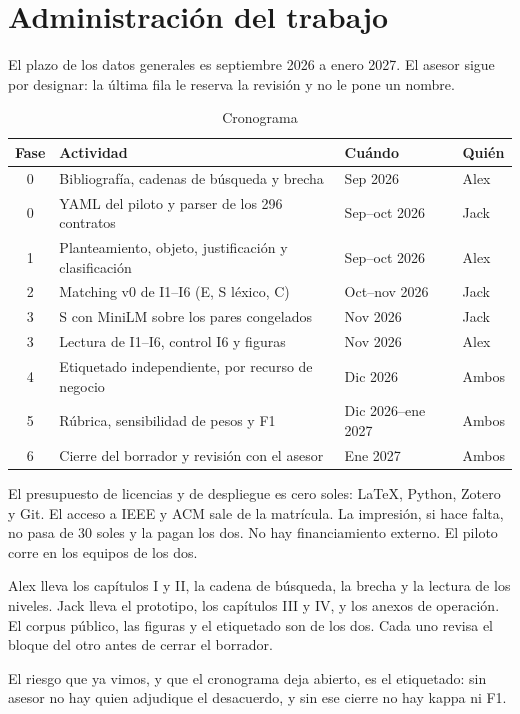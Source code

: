 \chapter{Administración del trabajo}
\label{anexo:admin}

El plazo de los datos generales es septiembre 2026 a enero 2027. El asesor sigue por designar: la última fila le reserva la revisión y no le pone un nombre.

\begin{table}[ht]
  \centering
  \caption{Cronograma}
  \label{tab:cronograma}
  \small
  \begin{tabular}{@{}clll@{}}
    \toprule
    Fase & Actividad & Cuándo & Quién \\
    \midrule
    0 & Bibliografía, cadenas de búsqueda y brecha & Sep 2026 & Alex \\
    0 & YAML del piloto y parser de los 296 contratos & Sep--oct 2026 & Jack \\
    1 & Planteamiento, objeto, justificación y clasificación & Sep--oct 2026 & Alex \\
    2 & Matching v0 de I1--I6 (E, S léxico, C) & Oct--nov 2026 & Jack \\
    3 & S con MiniLM sobre los pares congelados & Nov 2026 & Jack \\
    3 & Lectura de I1--I6, control I6 y figuras & Nov 2026 & Alex \\
    4 & Etiquetado independiente, por recurso de negocio & Dic 2026 & Ambos \\
    5 & Rúbrica, sensibilidad de pesos y F1 & Dic 2026--ene 2027 & Ambos \\
    6 & Cierre del borrador y revisión con el asesor & Ene 2027 & Ambos \\
    \bottomrule
  \end{tabular}
\end{table}

El presupuesto de licencias y de despliegue es cero soles: \LaTeX{}, Python, Zotero y Git. El acceso a IEEE y ACM sale de la matrícula. La impresión, si hace falta, no pasa de 30 soles y la pagan los dos. No hay financiamiento externo. El piloto corre en los equipos de los dos.

Alex lleva los capítulos I y II, la cadena de búsqueda, la brecha y la lectura de los niveles. Jack lleva el prototipo, los capítulos III y IV, y los anexos de operación. El corpus público, las figuras y el etiquetado son de los dos. Cada uno revisa el bloque del otro antes de cerrar el borrador.

El riesgo que ya vimos, y que el cronograma deja abierto, es el etiquetado: sin asesor no hay quien adjudique el desacuerdo, y sin ese cierre no hay kappa ni F1.
